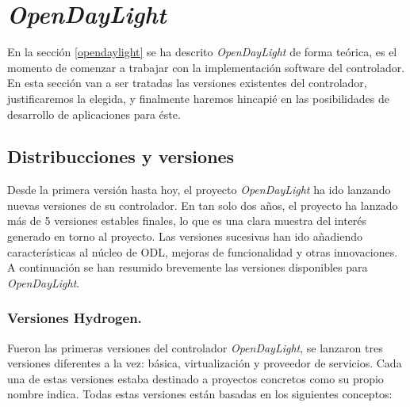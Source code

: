 \documentclass[a4paper,11pt]{book}
\begin{document}
\section{\emph{OpenDayLight}}
En la sección \ref{opendaylight} se ha descrito \emph{OpenDayLight} de forma teórica, es el momento de comenzar a trabajar con la implementación software del controlador. En esta sección van a ser tratadas las versiones existentes del controlador, justificaremos la elegida, y finalmente haremos hincapié en las posibilidades de desarrollo de aplicaciones para éste.

\subsection{Distribucciones y versiones}
Desde la primera versión hasta hoy, el proyecto \emph{OpenDayLight} ha ido lanzando nuevas versiones de su controlador. En tan solo dos años, el proyecto ha lanzado más de 5 versiones estables finales, lo que es una clara muestra del interés generado en torno al proyecto. Las versiones sucesivas han ido añadiendo características al núcleo de \ac{ODL}, mejoras de funcionalidad y otras innovaciones. A continuación se han resumido brevemente las versiones disponibles para \emph{OpenDayLight}.

\subsubsection{Versiones Hydrogen.} 

Fueron las primeras versiones del controlador \emph{OpenDayLight}, se lanzaron tres versiones diferentes a la vez: básica, virtualización y proveedor de servicios. Cada una de estas versiones estaba destinado a proyectos concretos como su propio nombre indica. Todas estas versiones están basadas en los siguientes conceptos:
\end{document}
